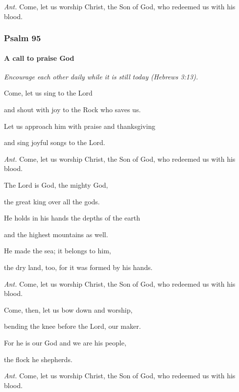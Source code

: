 \emph{Ant.} Come, let us worship Christ, the Son of God, who redeemed us with his blood.

\subsubsection{Psalm 95}	\paragraph{A call to praise God}




\vspace{5pt}
\emph{Encourage each other daily while it is still today (Hebrews 3:13).}
\vspace{5pt}

Come, let us sing to the Lord 

 \noindent  and shout with joy to the Rock who saves us.

\noindent Let us approach him with praise and thanksgiving 

\noindent   and sing joyful songs to the Lord.

\vspace{5pt}
\emph{Ant.} Come, let us worship Christ, the Son of God, who redeemed us with his blood.
\vspace{5pt}

The Lord is God, the mighty God, 

\noindent   the great king over all the gods.

\noindent He holds in his hands the depths of the earth 

\noindent   and the highest mountains as well.

\noindent He made the sea; it belongs to him, 

\noindent   the dry land, too, for it was formed by his hands.

\vspace{5pt}
\emph{Ant.} Come, let us worship Christ, the Son of God, who redeemed us with his blood.
\vspace{5pt}

Come, then, let us bow down and worship, 

\noindent   bending the knee before the Lord, our maker.

\noindent For he is our God and we are his people, 

\noindent   the flock he shepherds.

\vspace{5pt}
\emph{Ant.} Come, let us worship Christ, the Son of God, who redeemed us with his blood.
\vspace{5pt}

